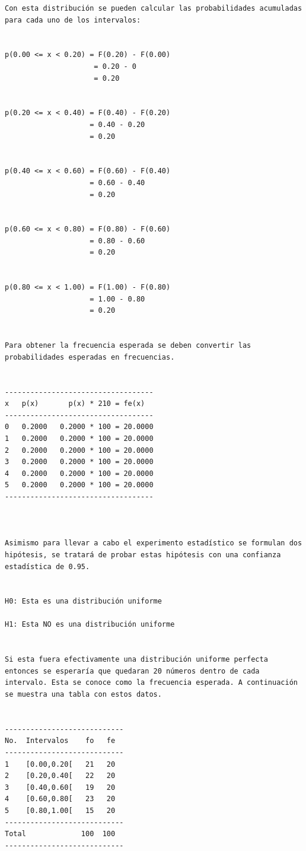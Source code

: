\begin{verbatim}
Con esta distribución se pueden calcular las probabilidades acumuladas para cada uno de los intervalos:


p(0.00 <= x < 0.20) = F(0.20) - F(0.00)
                     = 0.20 - 0
                     = 0.20

                  
p(0.20 <= x < 0.40) = F(0.40) - F(0.20)                  
                    = 0.40 - 0.20
                    = 0.20

                    
p(0.40 <= x < 0.60) = F(0.60) - F(0.40)
                    = 0.60 - 0.40
                    = 0.20

                    
p(0.60 <= x < 0.80) = F(0.80) - F(0.60)
                    = 0.80 - 0.60
                    = 0.20

                    
p(0.80 <= x < 1.00) = F(1.00) - F(0.80)
                    = 1.00 - 0.80
                    = 0.20
                    
                    
Para obtener la frecuencia esperada se deben convertir las probabilidades esperadas en frecuencias.


-----------------------------------
x   p(x)       p(x) * 210 = fe(x)
-----------------------------------
0   0.2000   0.2000 * 100 = 20.0000
1   0.2000   0.2000 * 100 = 20.0000
2   0.2000   0.2000 * 100 = 20.0000
3   0.2000   0.2000 * 100 = 20.0000
4   0.2000   0.2000 * 100 = 20.0000
5   0.2000   0.2000 * 100 = 20.0000
-----------------------------------
                   
                    

Asimismo para llevar a cabo el experimento estadístico se formulan dos hipótesis, se tratará de probar estas hipótesis con una confianza estadística de 0.95.


H0: Esta es una distribución uniforme

H1: Esta NO es una distribución uniforme

 
Si esta fuera efectivamente una distribución uniforme perfecta entonces se esperaría que quedaran 20 números dentro de cada intervalo. Esta se conoce como la frecuencia esperada. A continuación se muestra una tabla con estos datos.


----------------------------
No.  Intervalos    fo   fe
----------------------------
1    [0.00,0.20[   21   20
2    [0.20,0.40[   22   20
3    [0.40,0.60[   19   20
4    [0.60,0.80[   23   20
5    [0.80,1.00[   15   20
----------------------------
Total             100  100
----------------------------



\end{verbatim}
